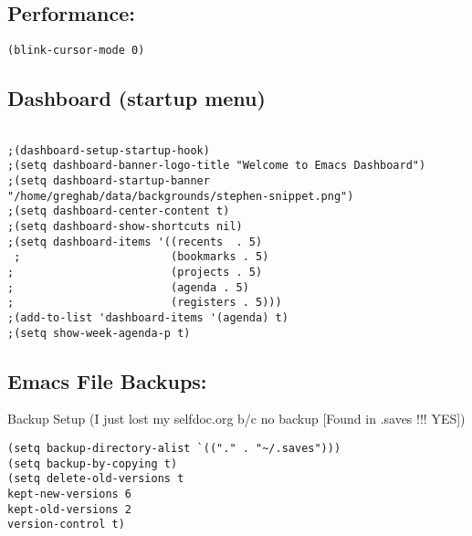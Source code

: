 \documentclass[11pt]{article}
\begin{document}
\subsection{Performance:}
\label{sec:org875bd54}


\begin{verbatim}
(blink-cursor-mode 0)
\end{verbatim}



\subsection{Dashboard (startup menu)}
\label{sec:orgec070fe}
\begin{verbatim}

;(dashboard-setup-startup-hook)
;(setq dashboard-banner-logo-title "Welcome to Emacs Dashboard")
;(setq dashboard-startup-banner "/home/greghab/data/backgrounds/stephen-snippet.png")
;(setq dashboard-center-content t)
;(setq dashboard-show-shortcuts nil)
;(setq dashboard-items '((recents  . 5)
 ;                       (bookmarks . 5)
;                        (projects . 5)
;                        (agenda . 5)
;                        (registers . 5)))
;(add-to-list 'dashboard-items '(agenda) t)
;(setq show-week-agenda-p t)
\end{verbatim}

\subsection{Emacs File Backups:}
\label{sec:org68e5637}


Backup Setup (I just lost my selfdoc.org b/c no backup [Found in .saves !!! YES])
\begin{verbatim}
(setq backup-directory-alist `(("." . "~/.saves")))
(setq backup-by-copying t)
(setq delete-old-versions t
kept-new-versions 6
kept-old-versions 2
version-control t)
\end{verbatim}
\end{document}
